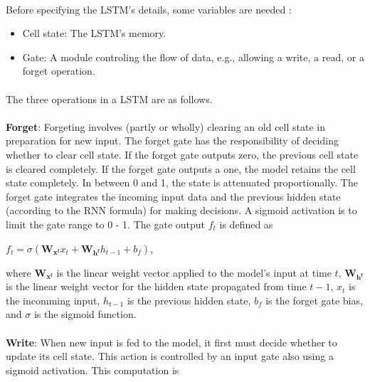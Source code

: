 \paragraph{}
Before specifying the LSTM's details, some variables are needed \cite{sirinart_tangruamsub_2017}:
\begin{itemize}
\item Cell state: The LSTM's memory.
\item Gate: A module controling the flow of data, e.g., allowing a write, a read, or a forget operation.
\end{itemize}
\paragraph{}
The three operations in a LSTM are as follows.

\paragraph{}
\textbf{Forget}: Forgeting involves (partly or wholly) clearing an old cell state in preparation for new input. The forget gate has the responsibility of deciding whether to clear cell state. If the forget gate outputs zero, the previous cell state is cleared completely. If the forget gate outputs a one, the model retains the cell state completely. In between 0 and 1, the state is attenuated proportionally. The forget gate integrates the incoming input data and the previous hidden state (according to the RNN formula) for making decisions. A sigmoid activation is to limit the gate range to 0 - 1. The gate output $f_t$ is defined as

\hfil $ f_t = \sigma(\mathbf{W_{x^f}}x_t + \mathbf{W_{h^f}}h_{t-1} + b_f) $, \par 

where $\mathbf{W_{x^f}}$ is the linear weight vector applied to the model's input at time $t$, $\mathbf{W_{h^f}}$ is the linear weight vector for the hidden state propagated from time $t-1$, $x_t$ is the incomming input, $h_{t-1}$ is the previous hidden state, $b_f$ is the forget gate bias, and $\sigma$ is the sigmoid function.

\paragraph{}
\textbf{Write}: When new input is fed to the model, it first must decide whether to update its cell state. This action is controlled by an input gate also using a sigmoid activation. This computation is 

